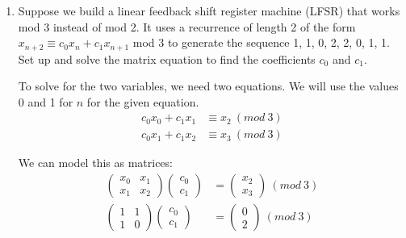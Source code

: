 \documentclass[10pt,letterpaper]{report}
\begin{document}
\begin{enumerate}
	
	\item Suppose we build a linear feedback shift register machine (LFSR) that works
	mod 3 instead of mod 2. It uses a recurrence of length 2 of the form
	$x_{n+2} \equiv c_0 x_n + c_1 x_{n+1}$ mod 3 to generate the sequence
	1, 1, 0, 2, 2, 0, 1, 1. Set up and solve the matrix equation to find the coefficients
	$c_0$ and $c_1$.
	
	\par
	To solve for the two variables, we need two equations. We will use the values 0 and 1
	for $n$ for the given equation.
	\begin{align*}
	 c_0 x_0 + c_1 x_1 &\equiv x_{2}   \ (mod\ 3)\\
	 c_0 x_1 + c_1 x_2  &\equiv x_{3}  \ (mod\ 3)
	\end{align*}
	
	We can model this as matrices:
	\begin{align*}
	\begin{pmatrix}
	x_0 & x_1 \\ x_1 & x_2
	\end{pmatrix}
	\begin{pmatrix}
	c_0 \\ c_1
	\end{pmatrix}
	&=
	\begin{pmatrix}
	x_2 \\ x_3
	\end{pmatrix}
	\ (mod\ 3) 	
	\\
	\begin{pmatrix}
	1 & 1 \\ 1 & 0
	\end{pmatrix}
	\begin{pmatrix}
	c_0 \\ c_1
	\end{pmatrix}
	&=
	\begin{pmatrix}
	0 \\ 2
	\end{pmatrix}
	\ (mod\ 3)
	\end{align*}
	

\end{enumerate}
\end{document}
